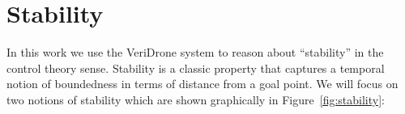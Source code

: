 \documentclass[preprint,nocopyrightspace]{sigplanconf}
\begin{document}





\section{Stability}

In this work we use the VeriDrone system to reason about ``stability'' in the control theory sense.
Stability is a classic property that captures a temporal notion of boundedness in terms of distance from a goal point.
We will focus on two notions of stability which are shown graphically in Figure~\ref{fig:stability}:
\end{document}
